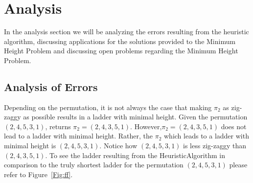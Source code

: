 \section{Analysis}
In the analysis section we will be analyzing the 
errors resulting from the heuristic algorithm, discussing applications for the solutions 
provided to the Minimum Height Problem and discussing open problems regarding the Minimum Height Problem.

\subsection{Analysis of Errors}
Depending on the permutation, it is not always the case that making $\pi_{2}$ as 
zig-zaggy as possible results in a ladder with minimal height. Given the 
permutation $(2,4,5,3,1)$,  returns $\pi_{2}=(2,4,3,5,1)$.
However,\newline$\pi_{2}=(2,4,3,5,1)$ does not lead to a 
ladder with  minimal height. Rather, the $\pi_{2}$ which leads 
to a ladder with minimal height is $(2,4,5,3,1)$. Notice 
how  $(2,4,5,3,1)$ is less zig-zaggy than $(2,4,3,5,1)$. 
To see the ladder resulting from the {\sc HeuristicAlgorithm} 
in comparison to the truly shortest ladder for the 
permutation $(2,4,5,3,1)$ please refer to Figure~\ref{Fig:ff}.\par 
